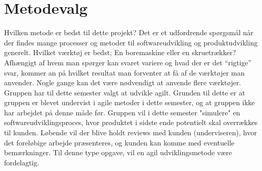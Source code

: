 \section{Metodevalg}\label{sec:valgafprocesmodel}
Hvilken metode er bedst til dette projekt? Det er et udfordrende spørgsmål når der findes mange processer 
og metoder til softwareudvikling og produktudvikling generelt. Hvilket værktøj er bedst; En boremaskine 
eller en skruetrækker? Afhængigt af hvem man spørger kan svaret variere og hvad der er det “rigtige” svar, 
kommer an på hvilket resultat man forventer at få af de værktøjer man anvender. Nogle gange kan det være nødvendigt at anvende flere værktøjer. \\

Gruppen har til dette semester valgt at udvikle agilt. Grunden til dette er at gruppen er blevet undervist i agile metoder i dette
semester, og at gruppen ikke har arbejdet på denne måde før. Gruppen vil i dette semester "simulere" en softwareudviklingsproces, hvor produktet
i sidste ende potentielt skal overrækkes til kunden. Løbende vil der blive holdt reviews med kunden (underviseren), hvor det foreløbige arbejde præsenteres,
og kunden kan komme med eventuelle bemærkninger. Til denne type opgave, vil en agil udviklingsmetode være fordelagtig.    
